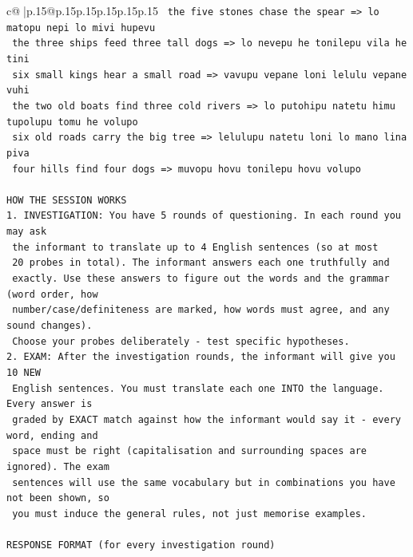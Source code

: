 \documentclass{article}
\begin{document}
{\begin{supertabular}{c@{$\;$}|p{.15\linewidth}@{}p{.15\linewidth}p{.15\linewidth}p{.15\linewidth}p{.15\linewidth}p{.15\linewidth}}
{{{\texttt{    the five stones chase the spear  =>  lo matopu nepi lo mivi hupevu} \\
\texttt{    the three ships feed three tall dogs  =>  lo nevepu he tonilepu vila he tini} \\
\texttt{    six small kings hear a small road  =>  vavupu vepane loni lelulu vepane vuhi} \\
\texttt{    the two old boats find three cold rivers  =>  lo putohipu natetu himu tupolupu tomu he volupo} \\
\texttt{    six old roads carry the big tree  =>  lelulupu natetu loni lo mano lina piva} \\
\texttt{    four hills find four dogs  =>  muvopu hovu tonilepu hovu volupo} \\
\\ 
\texttt{HOW THE SESSION WORKS} \\
\texttt{1. INVESTIGATION: You have 5 rounds of questioning. In each round you may ask} \\
\texttt{   the informant to translate up to 4 English sentences (so at most} \\
\texttt{   20 probes in total). The informant answers each one truthfully and} \\
\texttt{   exactly. Use these answers to figure out the words and the grammar (word order, how} \\
\texttt{   number/case/definiteness are marked, how words must agree, and any sound changes).} \\
\texttt{   Choose your probes deliberately {-} test specific hypotheses.} \\
\texttt{2. EXAM: After the investigation rounds, the informant will give you 10 NEW} \\
\texttt{   English sentences. You must translate each one INTO the language. Every answer is} \\
\texttt{   graded by EXACT match against how the informant would say it {-} every word, ending and} \\
\texttt{   space must be right (capitalisation and surrounding spaces are ignored). The exam} \\
\texttt{   sentences will use the same vocabulary but in combinations you have not been shown, so} \\
\texttt{   you must induce the general rules, not just memorise examples.} \\
\\ 
\texttt{RESPONSE FORMAT (for every investigation round)} \\
}}}
\end{supertabular}}
\end{document}
